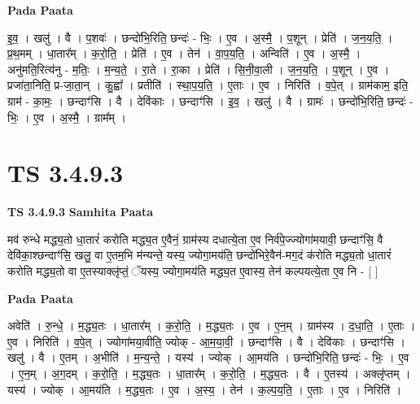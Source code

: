 \documentclass[17pt]{extarticle}
\begin{document}
\textbf{Pada Paata} \newline

इ॒व॒ । खलु॑ । वै । प॒शवः॑ । छन्दो॑भि॒रिति॒ छन्दः॑ - भिः॒ । ए॒व । अ॒स्मै॒ । प॒शून् । प्रेति॑ । ज॒न॒य॒ति॒ । प्र॒थ॒मम् । धा॒तार᳚म् । क॒रो॒ति॒ । प्रेति॑ । ए॒व । तेन॑ । वा॒प॒य॒ति॒ । अन्विति॑ । ए॒व । अ॒स्मै॒ । अनु॑मति॒रित्य॑नु - म॒तिः॒ । म॒न्य॒ते॒ । रा॒ते । रा॒का । प्रेति॑ । सि॒नी॒वा॒ली । ज॒न॒य॒ति॒ । प॒शून् । ए॒व । प्रजा॑ता॒निति॒ प्र-जा॒ता॒न् । कु॒ह्वा᳚ । प्रतीति॑ । स्था॒प॒य॒ति॒ । ए॒ताः । ए॒व । निरिति॑ । व॒पे॒त् । ग्राम॑काम॒ इति॒ ग्राम॑ - का॒मः॒ । छन्दाꣳ॑सि । वै । देवि॑काः । छन्दाꣳ॑सि । इ॒व॒ । खलु॑ । वै । ग्रामः॑ । छन्दो॑भि॒रिति॒ छन्दः॑ - भिः॒ । ए॒व । अ॒स्मै॒ । ग्राम᳚म् ।  \newline





\section{ TS 3.4.9.3 }

\textbf{TS 3.4.9.3 } \newline
\textbf{Samhita Paata} \newline

मव॑ रुन्धे मद्ध्य॒तो धा॒तारं॑ करोति मद्ध्य॒त ए॒वैनं॒ ग्राम॑स्य दधात्ये॒ता ए॒व निर्व॑पे॒ज्ज्योगा॑मयावी॒ छन्दाꣳ॑सि॒ वै देवि॑का॒श्छन्दाꣳ॑सि॒ खलु॒ वा ए॒तम॒भि म॑न्यन्ते॒ यस्य॒ ज्योगा॒मय॑ति॒ छन्दो॑भिरे॒वैन॑-मग॒दं क॑रोति मद्ध्य॒तो धा॒तारं॑ करोति मद्ध्य॒तो वा ए॒तस्याक्लृ॑प्तं॒ ॅयस्य॒ ज्योगा॒मय॑ति मद्ध्य॒त ए॒वास्य॒ तेन॑ कल्पयत्ये॒ता ए॒व नि - [  ] \newline

\textbf{Pada Paata} \newline

अवेति॑ । रु॒न्धे॒ । म॒द्ध्य॒तः । धा॒तार᳚म् । क॒रो॒ति॒ । म॒द्ध्य॒तः । ए॒व । ए॒न॒म् । ग्राम॑स्य । द॒धा॒ति॒ । ए॒ताः । ए॒व । निरिति॑ । व॒पे॒त् । ज्योगा॑मया॒वीति॒ ज्योक् - आ॒म॒या॒वी॒ । छन्दाꣳ॑सि । वै । देवि॑काः । छन्दाꣳ॑सि । खलु॑ । वै । ए॒तम् । अ॒भीति॑ । म॒न्य॒न्ते॒ । यस्य॑ । ज्योक् । आ॒मय॑ति । छन्दो॑भि॒रिति॒ छन्दः॑ - भिः॒ । ए॒व । ए॒न॒म् । अ॒ग॒दम् । क॒रो॒ति॒ । म॒द्ध्य॒तः । धा॒तार᳚म् । क॒रो॒ति॒ । म॒द्ध्य॒तः । वै । ए॒तस्य॑ । अक्लृ॑प्तम् । यस्य॑ । ज्योक् । आ॒मय॑ति । म॒द्ध्य॒तः । ए॒व । अ॒स्य॒ । तेन॑ । क॒ल्प॒य॒ति॒ । ए॒ताः । ए॒व । निरिति॑ ।  \newline




\end{document}

